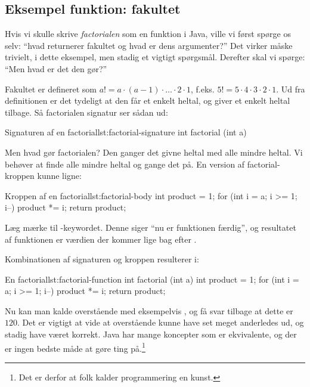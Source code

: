 	\subsection{Eksempel funktion: fakultet}

        Hvis vi skulle skrive \emph{\gls{factorial}en} som en
        funktion i Java, ville vi først spørge os selv: ``hvad
        returnerer fakultet og hvad er dens argumenter?'' Det virker
        måske trivielt, i dette eksempel, men stadig et vigtigt
        spørgsmål. Derefter skal vi spørge: ``Men hvad er det den
        gør?''

        Fakultet er defineret som \(a! = a \cdot (a-1) \cdot \dots
        \cdot 2 \cdot 1\), f.eks. \(5! = 5 \cdot 4 \cdot 3 \cdot 2
        \cdot 1\). Ud fra definitionen er det tydeligt at den får et
        enkelt heltal, og giver et enkelt heltal tilbage. Så
        \gls{factorial}en signatur ser sådan ud:

		\begin{JavaCode}{Signaturen af en \gls{factorial}}{lst:factorial-signature}
			int factorial (int a)
		\end{JavaCode}

		Men hvad gør \gls{factorial}en? Den ganger det givne heltal med alle mindre
		heltal. Vi behøver at finde alle mindre heltal og gange det på. En version
		af \gls{factorial}-kroppen kunne ligne:

		\begin{JavaCode}{Kroppen af en \gls{factorial}}{lst:factorial-body}
			int product = 1;
			for (int i = a; i >= 1; i--)
				product *= i;
			return product;
		\end{JavaCode}

        Læg mærke til -keywordet. Denne siger ``nu
        er funktionen færdig'', og resultatet af funktionen er værdien
        der kommer lige bag efter .

		Kombinationen af signaturen og kroppen resulterer i:

		\begin{JavaCode}{En \gls{factorial}}{lst:factorial-function}
			int factorial (int a) {
				int product = 1;
				for (int i = a; i >= 1; i--)
					product *= i;
				return product;
			}
		\end{JavaCode}

        Nu kan man kalde overstående med eksempelvis
        , og få svar tilbage at dette er
        \(120\). Det er vigtigt at vide at overstående kunne have set
        meget anderledes ud, og stadig have været korrekt. Java har
        mange koncepter som er ekvivalente, og der er ingen bedste
        måde at gøre ting på.\footnote{Det er derfor at folk kalder
        programmering en kunst.}

